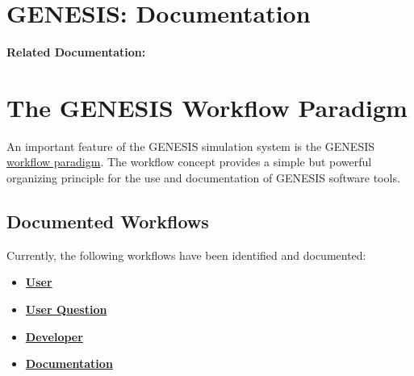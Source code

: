 \documentclass[12pt]{article}
\begin{document}
\section*{GENESIS: Documentation}

{\bf Related Documentation:}

\section*{The GENESIS Workflow Paradigm}

An important feature of the GENESIS simulation system is the GENESIS
\href{http://en.wikipedia.org/wiki/Workflow}{workflow paradigm}. The
workflow concept provides a simple but powerful organizing principle
for the use and documentation of GENESIS software tools.

\subsection*{Documented Workflows}
Currently, the following workflows have been identified and documented:
\begin{itemize}
\item \href{../workflow-user/workflow-user.tex}{\bf User}
\item \href{../workflow-user-query/workflow-user-query.tex}{\bf User Question}
\item \href{../workflow-developer/workflow-developer.tex}{\bf Developer}
\item \href{../workflow-documentation/workflow-documentation.tex}{\bf Documentation}
\end{itemize}
\end{document}
